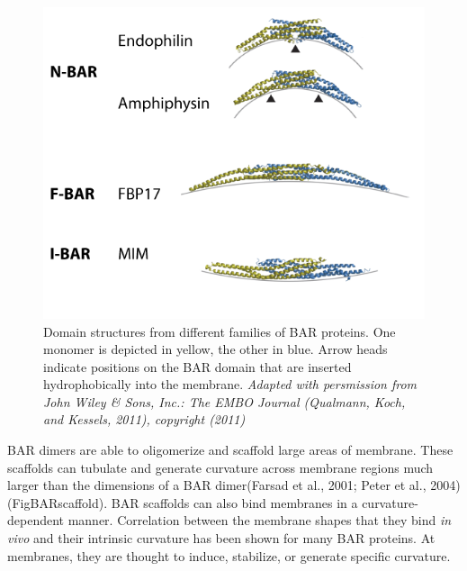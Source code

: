 \vspace{2mm}

\begin{figure}[H]
	\centering
	\includegraphics[scale=0.5]{figures/intro/BAR_structures}
		\caption[Structures of BAR domain dimers]{Domain structures from different families of BAR proteins. One monomer is depicted in yellow, the other in blue. Arrow heads indicate positions on the BAR domain that are inserted hydrophobically into the membrane. \textit{Adapted with persmission from John Wiley \& Sons, Inc.: The EMBO Journal (Qualmann, Koch, and Kessels, 2011), copyright (2011)}
		\label{bar_structures}}
\end{figure}

\vspace{5mm}
BAR dimers are able to oligomerize and scaffold large areas of membrane. These scaffolds can tubulate and generate curvature across membrane regions much larger than the dimensions of a BAR dimer(Farsad et al., 2001; Peter et al., 2004) (FigBARscaffold). BAR scaffolds can also bind membranes in a curvature-dependent manner. Correlation between the membrane shapes that they bind \textit{in vivo} and their intrinsic curvature has been shown for many BAR proteins. At membranes, they are thought to induce, stabilize, or generate specific curvature. 



